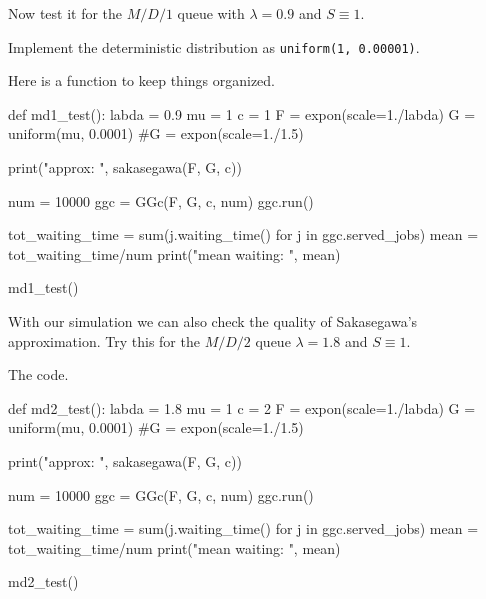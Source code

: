 \documentclass{scrartcl}
\begin{document}
\begin{exercise}
  Now test it for the $M/D/1$ queue with $\lambda=0.9$ and $S\equiv 1$.

\hintsymbol\begin{hint}
    Implement the deterministic distribution as \texttt{uniform(1, 0.00001)}.
  \end{hint}

  \begin{solution}
Here is a function to keep things organized.
  \begin{pyblock}
def md1_test():
    labda = 0.9
    mu = 1
    c = 1
    F = expon(scale=1./labda)
    G = uniform(mu, 0.0001)
    #G = expon(scale=1./1.5)

    print("approx: ", sakasegawa(F, G, c))

    num = 10000
    ggc = GGc(F, G, c, num)
    ggc.run()

    tot_waiting_time = sum(j.waiting_time() for j in ggc.served_jobs)
    mean = tot_waiting_time/num
    print("mean waiting: ", mean)
    

md1_test()

  \end{pyblock}
  \end{solution}

\end{exercise}

\begin{exercise}
With our simulation we can also check the quality of Sakasegawa's approximation. Try this for the $M/D/2$ queue $\lambda=1.8$ and $S\equiv 1$. 

\begin{solution}
The code.

  \begin{pyblock}
    
def md2_test():
    labda = 1.8
    mu = 1
    c = 2
    F = expon(scale=1./labda)
    G = uniform(mu, 0.0001)
    #G = expon(scale=1./1.5)

    print("approx: ", sakasegawa(F, G, c))

    num = 10000
    ggc = GGc(F, G, c, num)
    ggc.run()

    tot_waiting_time = sum(j.waiting_time() for j in ggc.served_jobs)
    mean = tot_waiting_time/num
    print("mean waiting: ", mean)


md2_test()

  \end{pyblock}
  
\end{solution}

\end{exercise}
\end{document}
